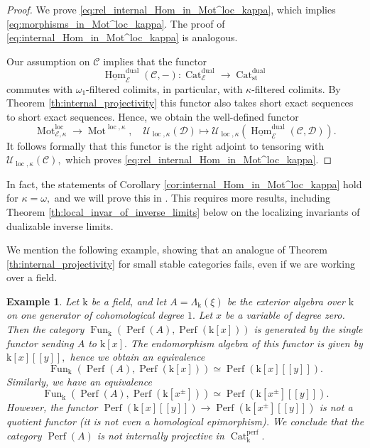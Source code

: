 \documentclass[11pt,leqno]{amsart}
\newtheorem{example}[theo]{Example}
\numberwithin{equation}{section}
\def\Hom{\operatorname{Hom}}
\newcommand{\Mot}{\operatorname{Mot}}
\newcommand{\Cat}{\operatorname{Cat}}
\newcommand{\loc}{\operatorname{loc}}
\newcommand{\st}{\operatorname{st}}
\newcommand{\dual}{\operatorname{dual}}
\newcommand{\mk}{\mathrm k}
\newcommand{\cD}{{\mathcal D}}
\newcommand{\cC}{{\mathcal C}}
\newcommand{\cE}{{\mathcal E}}
\newcommand{\cU}{{\mathcal U}}
\newcommand{\un}{\underline}
\newcommand{\Fun}{\operatorname{Fun}}
\newcommand{\Perf}{\operatorname{Perf}}
\newcommand{\perf}{\operatorname{perf}}
\begin{document}
\begin{proof}
We prove \eqref{eq:rel_internal_Hom_in_Mot^loc_kappa}, which implies \eqref{eq:morphisms_in_Mot^loc_kappa}. The proof of \eqref{eq:internal_Hom_in_Mot^loc_kappa} is analogous.

Our assumption on $\cC$ implies that the functor
\begin{equation*}
\un{\Hom}_{\cE}^{\dual}(\cC,-):\Cat_{\cE}^{\dual}\to\Cat_{\st}^{\dual}
\end{equation*}
commutes with $\omega_1$-filtered colimits, in particular, with $\kappa$-filtered colimits. By Theorem \ref{th:internal_projectivity} this functor also takes short exact sequences to short exact sequences. Hence, we obtain the well-defined functor
\begin{equation*}
\Mot^{\loc}_{\cE,\kappa}\to\Mot^{\loc,\kappa},\quad \cU_{\loc,\kappa}(\cD)\mapsto \cU_{\loc,\kappa}(\un{\Hom}_{\cE}^{\dual}(\cC,\cD)).
\end{equation*}
It follows formally that this functor is the right adjoint to tensoring with $\cU_{\loc,\kappa}(\cC),$ which proves \eqref{eq:rel_internal_Hom_in_Mot^loc_kappa}.
\end{proof}

In fact, the statements of Corollary \ref{cor:internal_Hom_in_Mot^loc_kappa} hold for $\kappa=\omega,$ and we will prove this in \cite{E}. This requires more results, including Theorem \ref{th:local_invar_of_inverse_limits} below on the localizing invariants of dualizable inverse limits.

We mention the following example, showing that an analogue of Theorem \ref{th:internal_projectivity} for small stable categories fails, even if we are working over a field.

\begin{example}
Let $\mk$ be a field, and let $A=\Lambda_{\mk}(\xi)$ be the exterior algebra over $\mk$ on one generator of cohomological degree $1.$ Let $x$ be a variable of degree zero. Then the category $\Fun_{\mk}(\Perf(A),\Perf(\mk[x]))$ is generated by the single functor sending $A$ to $\mk[x].$ The endomorphism algebra of this functor is given by $\mk[x][[y]],$ hence we obtain an equivalence
\begin{equation*}
\Fun_{\mk}(\Perf(A),\Perf(\mk[x]))\simeq \Perf(\mk[x][[y]]).
\end{equation*}
Similarly, we have an equivalence
\begin{equation*}
\Fun_{\mk}(\Perf(A),\Perf(\mk[x^{\pm}]))\simeq \Perf(\mk[x^{\pm}][[y]]).
\end{equation*}
However, the functor $\Perf(\mk[x][[y]])\to \Perf(\mk[x^{\pm}][[y]])$ is not a quotient functor (it is not even a homological epimorphism). We conclude that the category $\Perf(A)$ is not internally projective in $\Cat_{\mk}^{\perf}.$
\end{example} 
\end{document}
